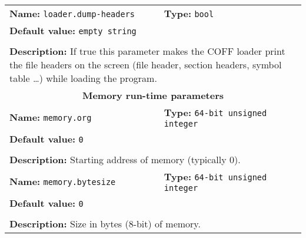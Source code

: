 \begin{center}
\begin{tabular}{|p{7.5cm}|p{7.5cm}|}
	\hline
	\multicolumn{1}{|p{7.5cm}}{\textbf{Name:} \texttt{loader.dump-headers}} & \multicolumn{1}{p{7.5cm}|}{\textbf{Type:} \texttt{bool}}\\
	\multicolumn{2}{|p{15cm}|}{\textbf{Default value:} \texttt{empty string}}\\
	\multicolumn{2}{|l|}{}\\
	\multicolumn{2}{|p{15cm}|}{\textbf{Description:} \newline If true this parameter makes the COFF loader print the file headers on the screen (file header, section headers, symbol table \ldots) while loading the program.}\\
	\hline
	\multicolumn{2}{|c|}{\textbf{\large Memory run-time parameters}}\\
	\hline
	\multicolumn{1}{|p{7.5cm}}{\textbf{Name:} \texttt{memory.org}} & \multicolumn{1}{p{7.5cm}|}{\textbf{Type:} \texttt{64-bit unsigned integer}}\\
	\multicolumn{2}{|p{15cm}|}{\textbf{Default value:} \texttt{0}}\\
	\multicolumn{2}{|l|}{}\\
	\multicolumn{2}{|p{15cm}|}{\textbf{Description:} \newline Starting address of memory (typically 0).}\\
	\hline
	\multicolumn{1}{|p{7.5cm}}{\textbf{Name:} \texttt{memory.bytesize}} & \multicolumn{1}{p{7.5cm}|}{\textbf{Type:} \texttt{64-bit unsigned integer}}\\
	\multicolumn{2}{|p{15cm}|}{\textbf{Default value:} \texttt{0}}\\
	\multicolumn{2}{|l|}{}\\
	\multicolumn{2}{|p{15cm}|}{\textbf{Description:} \newline Size in bytes (8-bit) of memory.}\\
	\hline
	\end{tabular}
\end{center}

